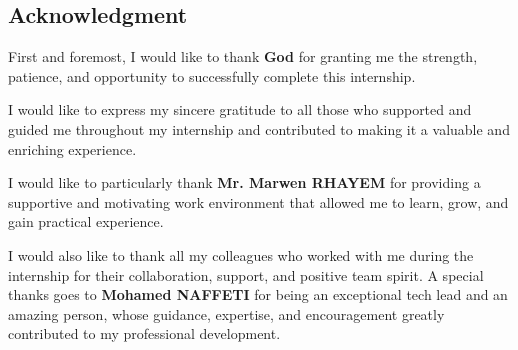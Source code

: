 \documentclass[12pt,a4paper]{report}
\begin{document}
\newpage




\thispagestyle{empty}
\begin{center}
  \null
  \vfill

  \section*{\centering Acknowledgment}

  \vspace{0.5cm}

  First and foremost, I would like to thank \textbf{God} for granting me the strength, patience, and opportunity to successfully complete this internship.

  \vspace{0.4cm}

  I would like to express my sincere gratitude to all those who supported and guided me throughout my internship and contributed to making it a valuable and enriching experience.

  \vspace{0.4cm}

  I would like to particularly thank \textbf{Mr. Marwen RHAYEM} for providing a supportive and motivating work environment that allowed me to learn, grow, and gain practical experience.

  \vspace{0.4cm}

  I would also like to thank all my colleagues who worked with me during the internship for their collaboration, support, and positive team spirit. A special thanks goes to \textbf{Mohamed NAFFETI} for being an exceptional tech lead and an amazing person, whose guidance, expertise, and encouragement greatly contributed to my professional development.


  \vfill
\end{center}


\newpage


\end{document}

